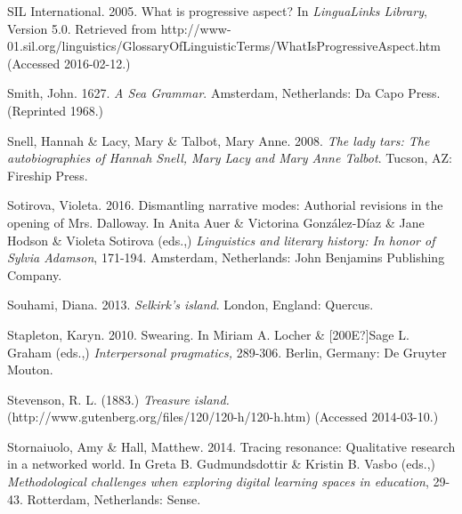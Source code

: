 \begin{styleStandard}
SIL International. 2005. What is progressive aspect? In \textit{LinguaLinks Library}, Version 5.0. Retrieved from http://www-01.sil.org/linguistics/GlossaryOfLinguisticTerms/WhatIsProgressiveAspect.htm (Accessed 2016-02-12.)
\end{styleStandard}


\begin{styleStandard}
Smith, John. 1627. \textit{A Sea Grammar}. Amsterdam, Netherlands: Da Capo Press. (Reprinted 1968.) 
\end{styleStandard}


\begin{styleStandard}
Snell, Hannah \& Lacy, Mary \& Talbot, Mary Anne. 2008. \textit{The lady tars: The autobiographies of Hannah Snell, Mary Lacy and Mary Anne Talbot}. Tucson, AZ: Fireship Press. 
\end{styleStandard}


\begin{styleStandard}
Sotirova, Violeta. 2016. Dismantling narrative modes: Authorial revisions in the opening of Mrs. Dalloway. In Anita Auer \& Victorina González-Díaz \& Jane Hodson \& Violeta Sotirova (eds.,) \textit{Linguistics and literary history: In honor of Sylvia Adamson}, 171-194. Amsterdam, Netherlands: John Benjamins Publishing Company.
\end{styleStandard}


\begin{styleStandard}
Souhami, Diana. 2013. \textit{Selkirk’s island}. London, England: Quercus.
\end{styleStandard}


\begin{styleStandard}
Stapleton, Karyn. 2010. Swearing. In Miriam A. Locher \& [200E?]Sage L. Graham (eds.,) \textit{Interpersonal pragmatics, }289-306.\textit{ }Berlin, Germany: De Gruyter Mouton.
\end{styleStandard}


\begin{styleStandard}
Stevenson, R. L. (1883.) \textit{Treasure island. }(http://www.gutenberg.org/files/120/120-h/120-h.htm) (Accessed 2014-03-10.)
\end{styleStandard}


\begin{styleStandard}
Stornaiuolo, Amy \& Hall, Matthew. 2014. Tracing resonance: Qualitative research in a networked world. In Greta B. Gudmundsdottir \& Kristin B. Vasbo (eds.,) \textit{Methodological challenges when exploring digital learning spaces in education}, 29-43. Rotterdam, Netherlands: Sense.
\end{styleStandard}


